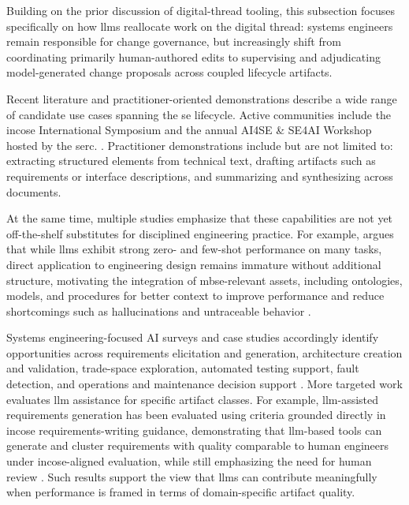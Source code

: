 Building on the prior discussion of digital-thread tooling, this subsection focuses specifically on how \acp{llm} reallocate work on the digital thread: systems engineers remain responsible for change governance, but increasingly shift from coordinating primarily human-authored edits to supervising and adjudicating model-generated change proposals across coupled lifecycle artifacts.

Recent literature and practitioner-oriented demonstrations describe a wide range of candidate use cases spanning the \ac{se} lifecycle. Active communities include the \ac{incose} International Symposium and the annual AI4SE \& SE4AI Workshop hosted by the \ac{serc}. \cite{incose_ProceedingsINCOSEInternational_2024, incose_ProceedingsINCOSEInternational_2025, serc_AI4SESE4AIWorkshop_2023, serc_AI4SESE4AIWorkshop_2024, serc_AI4SESE4AIWorkshop_2025}. Practitioner demonstrations include but are not limited to: extracting structured elements from technical text, drafting artifacts such as requirements or interface descriptions, and summarizing and synthesizing across documents.

At the same time, multiple studies emphasize that these capabilities are not yet off-the-shelf substitutes for disciplined engineering practice. For example, \cite{garciaalarcia_BringingSystemsEngineering_2024} argues that while \acp{llm} exhibit strong zero- and few-shot performance on many tasks, direct application to engineering design remains immature without additional structure, motivating the integration of \ac{mbse}-relevant assets, including ontologies, models, and procedures for better context to improve performance and reduce shortcomings such as hallucinations and untraceable behavior \cite{garciaalarcia_BringingSystemsEngineering_2024}. 

Systems engineering-focused AI surveys and case studies accordingly identify opportunities across requirements elicitation and generation, architecture creation and validation, trade-space exploration, automated testing support, fault detection, and operations and maintenance decision support \cite{gadewadikar_SystemsEngineeringLanguageModeling_2024}. More targeted work evaluates \ac{llm} assistance for specific artifact classes. For example, \ac{llm}-assisted requirements generation has been evaluated using criteria grounded directly in \ac{incose} requirements-writing guidance, demonstrating that \ac{llm}-based tools can generate and cluster requirements with quality comparable to human engineers under \ac{incose}-aligned evaluation, while still emphasizing the need for human review \cite{Stein_Leveraging_LLMs_Requirements_Generation_SE_Guidelines_2025}. Such results support the view that \acp{llm} can contribute meaningfully when performance is framed in terms of domain-specific artifact quality.

